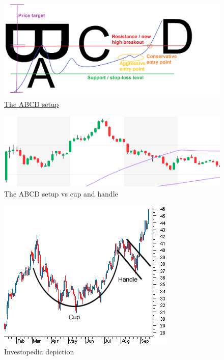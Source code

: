 \documentclass{article}
\begin{document}
\vspace{10pt}

\begin{figure}[!htb]
    \centering
    \includegraphics[width=\textwidth]{imgs/60.png}
    \caption{\href{https://ninetonoonsecrets.com/imgs/60.png}{The ABCD setup}}
\end{figure}

\vspace{10pt}

\begin{figure}[!htb]
    \centering
    \includegraphics[width=\textwidth]{imgs/61.png}
    \caption{The ABCD setup vs cup and handle}
\end{figure}

\vspace{10pt}

\begin{figure}[!htb]
    \centering
    \includegraphics[width=.7\textwidth]{imgs/62.png}
    \caption{Investopedia depiction}
\end{figure}
\end{document}
